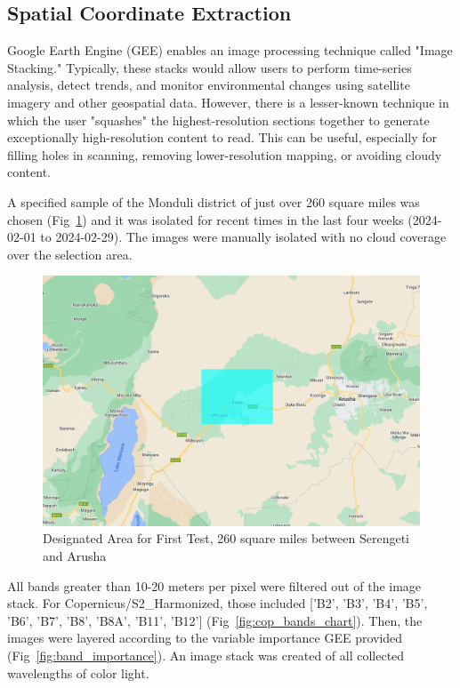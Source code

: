 \documentclass[10pt]{article}
\begin{document}

\subsection{Spatial Coordinate Extraction}
\label{procedure}

Google Earth Engine (GEE) enables an image processing technique called "Image Stacking." Typically, these stacks would allow users to perform time-series analysis, detect trends, and monitor environmental changes using satellite imagery and other geospatial data. However, there is a lesser-known technique in which the user "squashes" the highest-resolution sections together to generate exceptionally high-resolution content to read. This can be useful, especially for filling holes in scanning, removing lower-resolution mapping, or avoiding cloudy content. 

A specified sample of the Monduli district of just over 260 square miles was chosen (Fig~\ref{fig:designated_area}) and 
 it was isolated for recent times in the last four weeks (2024-02-01 to 2024-02-29). The images were manually isolated with no cloud coverage over the selection area.

\begin{figure} [H]
    \centering
    \includegraphics[width=1\linewidth]{images/studyarea.png}
    \caption{Designated Area for First Test, 260 square miles between Serengeti and Arusha}
    \label{fig:designated_area}
\end{figure}

All bands greater than 10-20 meters per pixel were filtered out of the image stack. For Copernicus/S2\_Harmonized, those included ['B2', 'B3', 'B4', 'B5', 'B6', 'B7', 'B8', 'B8A', 'B11', 'B12'] (Fig~\ref{fig:cop_bands_chart}). Then, the images were layered according to the variable importance GEE provided (Fig~\ref{fig:band_importance}). An image stack was created of all collected wavelengths of color light.
\end{document}
